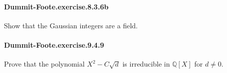 \documentclass{article}
\begin{document}
\paragraph{Dummit-Foote.exercise.8.3.6b} Show that the Gaussian integers are a field.




\paragraph{Dummit-Foote.exercise.9.4.9} Prove that the polynomial $X^2 - C \sqrt{d}$ is irreducible in $\mathbb{Q}[X]$ for $d \neq 0$.


\end{document}

